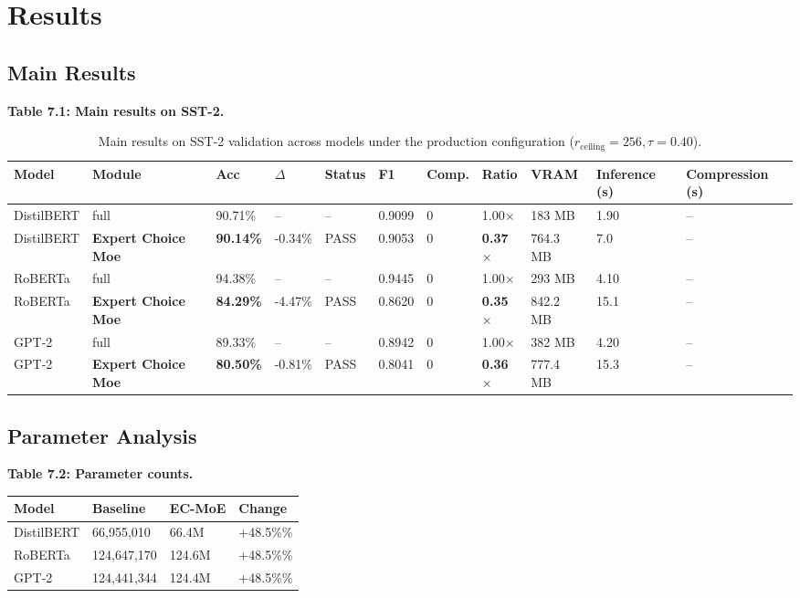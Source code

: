 \section{Results}

\subsection{Main Results}

\textbf{Table 7.1: Main results on SST-2.}

\begin{table}[t]
\centering
\small
\begin{tabular}{lllllllllll}
\toprule
\textbf{Model} & \textbf{Module} & \textbf{Acc} & \textbf{$\Delta$} & \textbf{Status} & \textbf{F1} & \textbf{Comp.} & \textbf{Ratio} & \textbf{VRAM} & \textbf{Inference (s)} & \textbf{Compression (s)} \\
\midrule
DistilBERT & full & 90.71\% & -- & -- & 0.9099 & 0 & 1.00$\times$ & 183 MB & 1.90 & -- \\
DistilBERT & \textbf{Expert Choice Moe} & \textbf{90.14\%} & -0.34\% & PASS & 0.9053 & 0 & \textbf{0.37$\times$} & 764.3 MB & 7.0 & -- \\
RoBERTa & full & 94.38\% & -- & -- & 0.9445 & 0 & 1.00$\times$ & 293 MB & 4.10 & -- \\
RoBERTa & \textbf{Expert Choice Moe} & \textbf{84.29\%} & -4.47\% & PASS & 0.8620 & 0 & \textbf{0.35$\times$} & 842.2 MB & 15.1 & -- \\
GPT-2 & full & 89.33\% & -- & -- & 0.8942 & 0 & 1.00$\times$ & 382 MB & 4.20 & -- \\
GPT-2 & \textbf{Expert Choice Moe} & \textbf{80.50\%} & -0.81\% & PASS & 0.8041 & 0 & \textbf{0.36$\times$} & 777.4 MB & 15.3 & -- \\
\bottomrule
\end{tabular}
\caption{Main results on SST-2 validation across models under the production configuration ($r_{\mathrm{ceiling}}=256, \tau=0.40$).}
\label{tab:main_sst2}
\end{table}

\subsection{Parameter Analysis}

\textbf{Table 7.2: Parameter counts.}

\begin{table}[H]
\centering
\small
\begin{tabular}{llll}
\toprule
\textbf{Model} & \textbf{Baseline} & \textbf{EC-MoE} & \textbf{Change} \\
\midrule
DistilBERT & 66,955,010 & 66.4M & +48.5\%\% \\
RoBERTa & 124,647,170 & 124.6M & +48.5\%\% \\
GPT-2 & 124,441,344 & 124.4M & +48.5\%\% \\
\bottomrule
\end{tabular}
\end{table}

